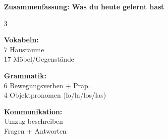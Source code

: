 \documentclass[11pt, a4paper]{article}
\begin{document}
\begin{merkbox}
\textbf{Zusammenfassung: Was du heute gelernt hast}

\vspace{4pt}

\begin{multicols}{3}
{\footnotesize

\textbf{Vokabeln:}\\
7 Hausräume\\
17 Möbel/Gegenstände

\columnbreak

\textbf{Grammatik:}\\
6 Bewegungsverben + Präp.\\
4 Objektpronomen (lo/la/los/las)

\columnbreak

\textbf{Kommunikation:}\\
Umzug beschreiben\\
Fragen + Antworten

}
\end{multicols}
\end{merkbox}
\end{document}
